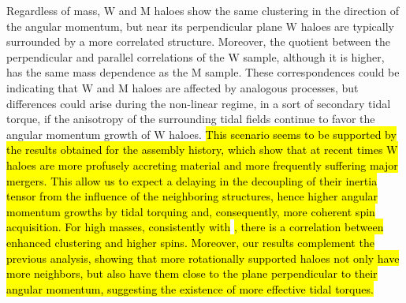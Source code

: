 \documentclass[fleqn,usenatbib]{mnras}
\newcommand{\Wh}{\mathrm{W}}
\newcommand{\Mh}{\mathrm{M}}
\begin{document}
Regardless of mass, $\Wh$ and $\Mh$ haloes show the same clustering in the direction of the angular momentum, but near its perpendicular plane $\Wh$ haloes are typically surrounded by a more correlated structure. Moreover, the quotient between the perpendicular and parallel correlations of the $\Wh$ sample, although it is higher, has the same mass dependence as the $\Mh$ sample.
These correspondences could be indicating that $\Wh$ and $\Mh$ haloes are affected by analogous processes, but differences could arise during the non-linear regime, in a sort of secondary tidal torque, if the anisotropy of the surrounding tidal fields continue to favor the angular momentum growth of $\Wh$ haloes. \hl{This scenario seems to be supported by the results obtained for the assembly history, which show that at recent times $\Wh$ haloes are more profusely accreting material and more frequently suffering major mergers. This allow us to expect a delaying in the decoupling of their inertia tensor from the influence of the neighboring structures, hence higher angular momentum growths by tidal torquing and, consequently, more coherent spin acquisition. For high masses, consistently with} \citet{faltenbacherywhite2010}\hl{, there is a correlation between enhanced clustering and higher spins. Moreover, our results complement the previous analysis, showing that more rotationally supported haloes not only have more neighbors, but also have them close to the plane perpendicular to their angular momentum, suggesting the existence of more effective tidal torques.}
\end{document}
